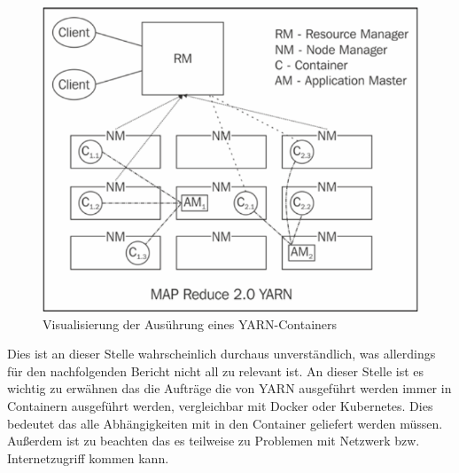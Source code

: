 \documentclass[12pt,oneside,a4paper,parskip]{scrbook}
\begin{document}
\begin{figure}[H]
	\centering
	\includegraphics[scale=0.9]{yarnOverview.png}
	\captionsetup{justification=centering}
	\caption{Visualisierung der Aus\"uhrung eines YARN-Containers}
	\label{pic:yarnOverview}
\end{figure}
Dies ist an dieser Stelle wahrscheinlich durchaus unverst\"andlich, was allerdings f\"ur den nachfolgenden Bericht nicht all zu relevant ist.
\newline An dieser Stelle ist es wichtig zu erw\"ahnen das die Auftr\"age die von YARN ausgef\"uhrt werden immer in Containern ausgef\"uhrt werden, vergleichbar mit Docker oder Kubernetes. Dies bedeutet das alle Abh\"angigkeiten mit in den Container geliefert werden m\"ussen. Außerdem ist zu beachten das es teilweise zu Problemen mit Netzwerk bzw. Internetzugriff kommen kann.
\end{document}
